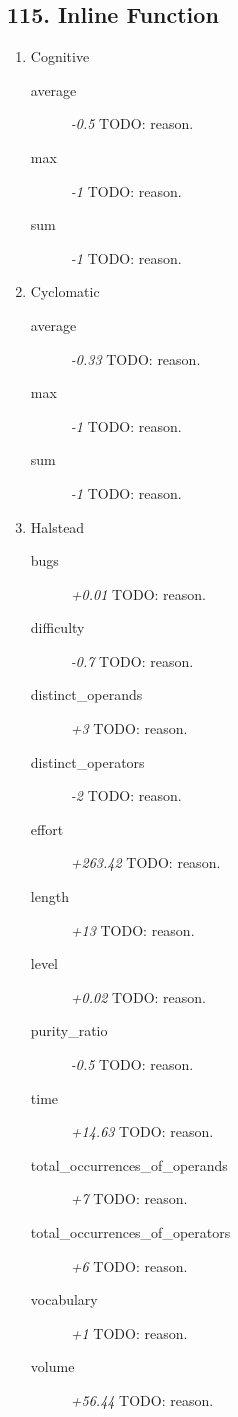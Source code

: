\subsection{115. Inline Function}

\begin{enumerate}
  \item Cognitive
        \begin{description}
          \item [average] \textit{-0.5} TODO: reason.
          \item [max] \textit{-1} TODO: reason.
          \item [sum] \textit{-1} TODO: reason.
        \end{description}
  \item Cyclomatic
        \begin{description}
          \item [average] \textit{-0.33} TODO: reason.
          \item [max] \textit{-1} TODO: reason.
          \item [sum] \textit{-1} TODO: reason.
        \end{description}
  \item Halstead
        \begin{description}
          \item [bugs] \textit{+0.01} TODO: reason.
          \item [difficulty] \textit{-0.7} TODO: reason.
          \item [distinct\_operands] \textit{+3} TODO: reason.
          \item [distinct\_operators] \textit{-2} TODO: reason.
          \item [effort] \textit{+263.42} TODO: reason.
          \item [length] \textit{+13} TODO: reason.
          \item [level] \textit{+0.02} TODO: reason.
          \item [purity\_ratio] \textit{-0.5} TODO: reason.
          \item [time] \textit{+14.63} TODO: reason.
          \item [total\_occurrences\_of\_operands] \textit{+7} TODO: reason.
          \item [total\_occurrences\_of\_operators] \textit{+6} TODO: reason.
          \item [vocabulary] \textit{+1} TODO: reason.
          \item [volume] \textit{+56.44} TODO: reason.

\end{description}
\end{enumerate}

